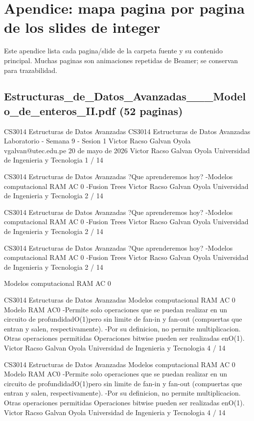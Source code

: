 \clearpage
\section{Apendice: mapa pagina por pagina de los slides de integer}
Este apendice lista cada pagina/slide de la carpeta fuente y su contenido principal. Muchas paginas son animaciones repetidas de Beamer; se conservan para trazabilidad.
\subsection*{Estructuras\_de\_Datos\_Avanzadas\_\_\_Modelo\_de\_enteros\_II.pdf (52 paginas)}
\begin{description}[leftmargin=!,labelwidth=4.2em,style=nextline]
\item[Pag. 1] CS3014 Estructuras de Datos Avanzadas CS3014 Estructuras de Datos Avanzadas Laboratorio - Semana 9 - Sesion 1 Victor Racso Galvan Oyola vgalvan@utec.edu.pe 20 de mayo de 2026 Victor Racso Galvan Oyola Universidad de Ingenieria y Tecnologia 1 / 14
\item[Pag. 2] CS3014 Estructuras de Datos Avanzadas ?Que aprenderemos hoy? -Modelos computacional RAM AC 0 -Fusion Trees Victor Racso Galvan Oyola Universidad de Ingenieria y Tecnologia 2 / 14
\item[Pag. 3] CS3014 Estructuras de Datos Avanzadas ?Que aprenderemos hoy? -Modelos computacional RAM AC 0 -Fusion Trees Victor Racso Galvan Oyola Universidad de Ingenieria y Tecnologia 2 / 14
\item[Pag. 4] CS3014 Estructuras de Datos Avanzadas ?Que aprenderemos hoy? -Modelos computacional RAM AC 0 -Fusion Trees Victor Racso Galvan Oyola Universidad de Ingenieria y Tecnologia 2 / 14
\item[Pag. 5] Modelos computacional RAM AC 0
\item[Pag. 6] CS3014 Estructuras de Datos Avanzadas Modelos computacional RAM AC 0 Modelo RAM AC0 -Permite solo operaciones que se puedan realizar en un circuito de profundidadO(1)pero sin limite de fan-in y fan-out (compuertas que entran y salen, respectivamente). -Por su definicion, no permite multiplicacion. Otras operaciones permitidas Operaciones bitwise pueden ser realizadas enO(1). Victor Racso Galvan Oyola Universidad de Ingenieria y Tecnologia 4 / 14
\item[Pag. 7] CS3014 Estructuras de Datos Avanzadas Modelos computacional RAM AC 0 Modelo RAM AC0 -Permite solo operaciones que se puedan realizar en un circuito de profundidadO(1)pero sin limite de fan-in y fan-out (compuertas que entran y salen, respectivamente). -Por su definicion, no permite multiplicacion. Otras operaciones permitidas Operaciones bitwise pueden ser realizadas enO(1). Victor Racso Galvan Oyola Universidad de Ingenieria y Tecnologia 4 / 14

\end{description}
